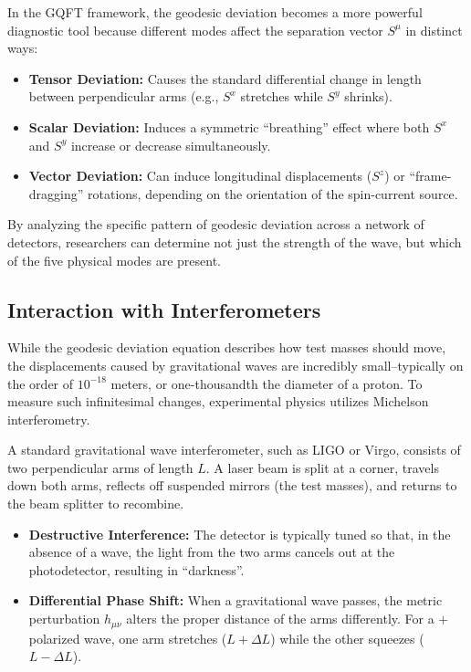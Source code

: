 In the GQFT framework, the geodesic deviation becomes a more powerful diagnostic tool because different modes affect the separation vector $S^\mu$ in distinct ways:
\begin{itemize}
  \item \textbf{Tensor Deviation:} Causes the standard differential change in length between perpendicular arms (e.g., $S^x$ stretches while $S^y$ shrinks).
  \item \textbf{Scalar Deviation:} Induces a symmetric ``breathing'' effect where both $S^x$ and $S^y$ increase or decrease simultaneously.
  \item \textbf{Vector Deviation:} Can induce longitudinal displacements ($S^z$) or ``frame-dragging'' rotations, depending on the orientation of the spin-current source.
\end{itemize}

By analyzing the specific pattern of geodesic deviation across a network of detectors, researchers can determine not just the strength of the wave, but which of the five physical modes are present.

\subsection{Interaction with Interferometers} While the geodesic deviation equation describes how test masses should move, the displacements caused by gravitational waves are incredibly small--typically on the order of $10^{-18}$ meters, or one-thousandth the diameter of a proton. To measure such infinitesimal changes, experimental physics utilizes Michelson interferometry.

A standard gravitational wave interferometer, such as LIGO or Virgo, consists of two perpendicular arms of length $L$. A laser beam is split at a corner, travels down both arms, reflects off suspended mirrors (the test masses), and returns to the beam splitter to recombine.
\begin{itemize}
  \item \textbf{Destructive Interference:} The detector is typically tuned so that, in the absence of a wave, the light from the two arms cancels out at the photodetector, resulting in ``darkness''.
  \item \textbf{Differential Phase Shift:} When a gravitational wave passes, the metric perturbation $h_{\mu\nu}$ alters the proper distance of the arms differently. For a $+$ polarized wave, one arm stretches ($L + \Delta L$) while the other squeezes ($L - \Delta L$).
\end{itemize}

